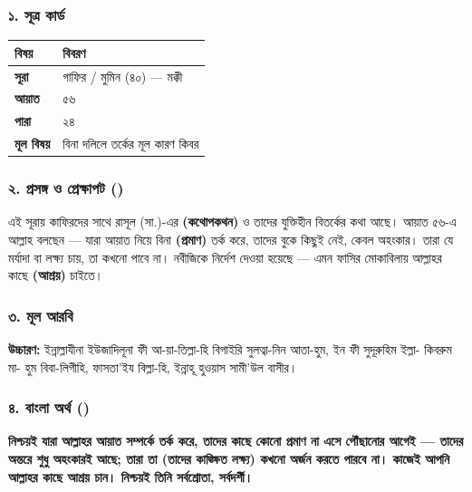 \subsubsection*{১. সূত্র কার্ড}

\begin{table}[h]\centering\small
\begin{tabular}{ll}
বিষয় & বিবরণ \\
\hline
\textbf{সূরা} & গাফির / মুমিন (৪০) — মক্কী \\
\textbf{আয়াত} & ৫৬ \\
\textbf{পারা} & ২৪ \\
\textbf{মূল বিষয়} & বিনা দলিলে তর্কের মূল কারণ কিবর \\
\hline
\end{tabular}
\end{table}

\subsubsection*{২. প্রসঙ্গ ও প্রেক্ষাপট ()}

এই সূরায় কাফিরদের সাথে রাসূল (সা.)-এর \textbf{ (কথোপকথন)} ও তাদের যুক্তিহীন বিতর্কের কথা আছে। আয়াত ৫৬-এ আল্লাহ বলছেন — যারা আয়াত নিয়ে বিনা \textbf{ (প্রমাণ)} তর্ক করে, তাদের বুকে কিছুই নেই, কেবল অহংকার। তারা যে মর্যাদা বা লক্ষ্য চায়, তা কখনো পাবে না। নবীজিকে নির্দেশ দেওয়া হয়েছে — এমন ফাসির মোকাবিলায় আল্লাহর কাছে \textbf{ (আশ্রয়)} চাইতে।

\subsubsection*{৩. মূল আরবি}
\begin{center}\end{center}
\textbf{উচ্চারণ:} ইন্নাল্লাযীনা ইউজাদিলূনা ফী আ-য়া-তিল্লা-হি বিগাইরি সুলত্বা-নিন আতা-হুম, ইন ফী সুদূরুহিম ইল্লা- কিবরুম মা- হুম বিবা-লিগীহি, ফাসতা'ইয বিল্লা-হি, ইন্নাহূ হুওয়াস সামী'উল বাসীর।

\subsubsection*{৪. বাংলা অর্থ ()}
\textbf{নিশ্চয়ই যারা আল্লাহর আয়াত সম্পর্কে তর্ক করে, তাদের কাছে কোনো প্রমাণ না এসে পৌঁছানোর আগেই — তাদের অন্তরে শুধু অহংকারই আছে; তারা তা (তাদের কাঙ্ক্ষিত লক্ষ্য) কখনো অর্জন করতে পারবে না। কাজেই আপনি আল্লাহর কাছে আশ্রয় চান। নিশ্চয়ই তিনি সর্বশ্রোতা, সর্বদর্শী।}

